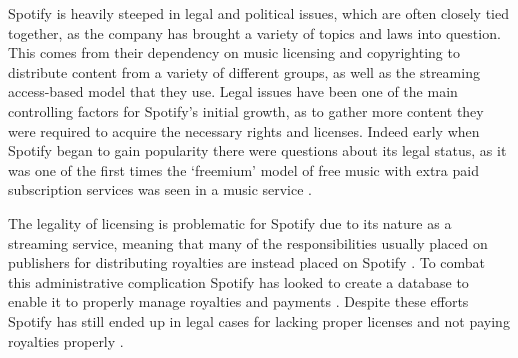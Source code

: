 \par
Spotify is heavily steeped in legal and political issues, which are often closely tied together, as the company has brought a variety of topics and laws into question. This comes from their dependency on music licensing and copyrighting to distribute content from a variety of different groups, as well as the streaming access-based model that they use. Legal issues have been one of the main controlling factors for Spotify's initial growth, as to gather more content they were required to acquire the necessary rights and licenses. Indeed early when Spotify began to gain popularity there were questions about its legal status, as it was one of the first times the `freemium' model of free music with extra paid subscription services was seen in a music service \parencite{spotify_legal_question, spotify_just_begin}.
\par
The legality of licensing is problematic for Spotify due to its nature as a streaming service, meaning that many of the responsibilities usually placed on publishers for distributing royalties are instead placed on Spotify \parencite{spotify_legal_tangle_billboard}. To combat this administrative complication Spotify has looked to create a database to enable it to properly manage royalties and payments \parencite{spotify_royalties_database, spotify_royalties_database_billboard}. Despite these efforts Spotify has still ended up in legal cases for lacking proper licenses and not paying royalties properly \parencite{spotify_legal_tangle_billboard, spotify_second_lawsuit, spotify_publishers_settlement}.
